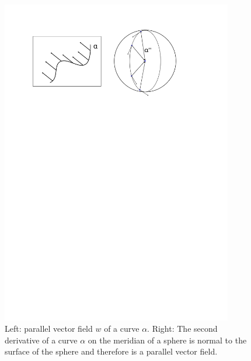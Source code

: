 \begin{figure}[h]
	\centering
	\includegraphics[width = 0.9\textwidth]{pictures/parallel_vectorfield}
	\caption{Left: parallel vector field $w$ of a curve $\alpha$. Right: The second derivative of a curve $\alpha$ on the meridian of a sphere is normal to the surface of the sphere and therefore is a parallel vector field.}
	\label{fig:parallel_vec}
\end{figure}


